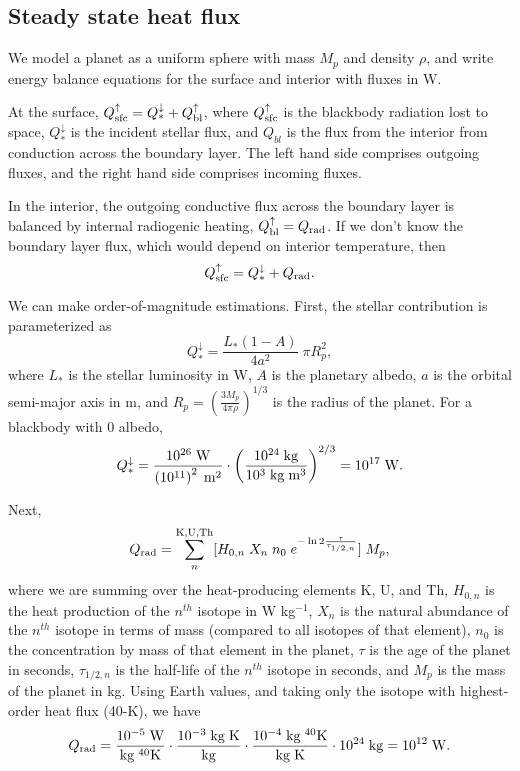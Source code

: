 \documentclass[10pt,a4paper]{article}
\begin{document}
\subsection{Steady state heat flux}

We model a planet as a uniform sphere with mass $M_p$ and density $\rho$, and write energy balance equations for the surface and interior with fluxes in W.

At the surface, $Q_{\rm sfc}^{\uparrow} = Q_*^{\downarrow} + Q^{\uparrow}_{\rm bl}$, where $Q_{\rm sfc}^{\uparrow}$ is the blackbody radiation lost to space, $Q_*^{\downarrow}$ is the incident stellar flux, and $Q_{bl}$ is the flux from the interior from conduction across the boundary layer. The left hand side comprises outgoing fluxes, and the right hand side comprises incoming fluxes.

In the interior, the outgoing conductive flux across the boundary layer is balanced by internal radiogenic heating, $Q^{\uparrow}_{\rm bl} = Q_{\rm rad}$. If we don't know the boundary layer flux, which would depend on interior temperature, then
\begin{equation}
Q_{\rm sfc}^{\uparrow} = Q_*^{\downarrow} + Q_{\rm rad}.
\end{equation}

We can make order-of-magnitude estimations. First, the stellar contribution is parameterized as
\begin{equation}
Q_*^{\downarrow} = \frac{L_*(1-A)}{4a^2} \; \pi R_p^2,
\end{equation}
where $L_*$ is the stellar luminosity in W, $A$ is the planetary albedo, $a$ is the orbital semi-major axis in m, and $R_p = \left(\frac{3M_p}{4 \pi \rho}\right)^{1/3}$ is the radius of the planet. For a blackbody with 0 albedo,
\begin{equation}
Q_*^{\downarrow} = \frac{10^{26} \; {\rm W}}{\left(10^{11}\right)^2 \; \rm{m}^2} \cdot \left(\frac{10^{24}\;{\rm kg}}{10^3 \; {\rm kg}\;{\rm m}^3}\right)^{2/3} = 10^{17} \; {\rm W}.
\end{equation}


Next,
\begin{equation}
Q_{\rm rad} = \sum^{\rm K, U, Th}_n [ H_{0, n} \; X_n \; n_0 \; e^{-\ln 2 \frac{\tau}{\tau_{1/2 ,n}}} ] \; M_p,
\end{equation}
where we are summing over the heat-producing elements K, U, and Th, $H_{0, n}$ is the heat production of the $n^{th}$ isotope in W kg$^{-1}$, $X_n$ is the natural abundance of the $n^{th}$ isotope in terms of mass (compared to all isotopes of that element), $n_0$ is the concentration by mass of that element in the planet, $\tau$ is the age of the planet in seconds,  $\tau_{1/2 ,n}$ is the half-life of the $n^{th}$ isotope in seconds, and $M_p$ is the mass of the planet in kg. Using Earth values, and taking only the isotope with highest-order heat flux (40-K), we have
\begin{equation}
Q_{\rm rad} = \frac{10^{-5}\;{\rm W}}{{\rm kg}\;^{40}{\rm K}} \cdot \frac{10^{-3}\;\rm{kg\;K}}{\rm kg} \cdot \frac{10^{-4}\;{\rm kg}\;^{40}{\rm K}}{\rm{kg\;K}} \cdot 10^{24} \; {\rm kg} = 10^{12} \; {\rm W}.
\end{equation}
\end{document}
